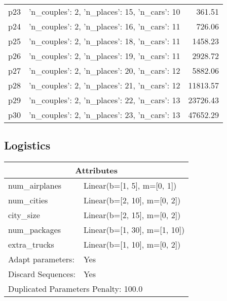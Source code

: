 \documentclass{article}
\begin{document}
\begin{center}
\begin{tabular}{@{}l|r|r@{}}
  p23&{'n\_couples': 2, 'n\_places': 15, 'n\_cars': 10}&361.51\\
  p24&{'n\_couples': 2, 'n\_places': 16, 'n\_cars': 11}&726.06\\
  p25&{'n\_couples': 2, 'n\_places': 18, 'n\_cars': 11}&1458.23\\
  p26&{'n\_couples': 2, 'n\_places': 19, 'n\_cars': 11}&2928.72\\
  p27&{'n\_couples': 2, 'n\_places': 20, 'n\_cars': 12}&5882.06\\
  p28&{'n\_couples': 2, 'n\_places': 21, 'n\_cars': 12}&11813.57\\
  p29&{'n\_couples': 2, 'n\_places': 22, 'n\_cars': 13}&23726.43\\
  p30&{'n\_couples': 2, 'n\_places': 23, 'n\_cars': 13}&47652.29
                            \end{tabular}
                            \end{center}
                    
                            \newpage \subsection{Logistics}
                    \begin{center}
                    \begin{tabular}{@{}p{}p{}@{}}
                    \multicolumn{2}{c}{\bf \large Attributes}\\\midrule
                    num\_airplanes & Linear(b=[1, 5], m=[0, 1])\\
num\_cities & Linear(b=[2, 10], m=[0, 2])\\
city\_size & Linear(b=[2, 15], m=[0, 2])\\
num\_packages & Linear(b=[1, 30], m=[1, 10])\\
extra\_trucks & Linear(b=[1, 10], m=[0, 2])
                    \\\midrule
                    Adapt parameters: & Yes
                                \\\midrule
                                Discard Sequences: & Yes \\\midrule
                    \multicolumn{2}{l}{Duplicated Parameters Penalty: 100.0}
                    \end{tabular}
                    \end{center}
                
\end{document}
